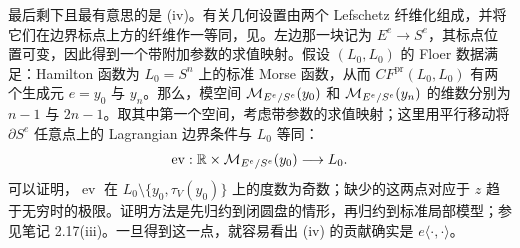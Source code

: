 \begin{note}
最后剩下且最有意思的是 (iv)。有关几何设置由两个 Lefschetz 纤维化组成，并将它们在边界标点上方的纤维作一等同，见。左边那一块记为 $E^e\to S^e$，其标点位置可变，因此得到一个带附加参数的求值映射。假设 $(L_0,L_0)$ 的 Floer 数据满足：Hamilton 函数为 $L_0=S^n$ 上的标准 Morse 函数，从而 $CF^{\mathrm{pr}}(L_0,L_0)$ 有两个生成元 $e=y_0$ 与 $y_n$。那么，模空间 $\mathcal M_{E^e/S^e}(y_0)$ 和 $\mathcal M_{E^e/S^e}(y_n)$ 的维数分别为 $n-1$ 与 $2n-1$。取其中第一个空间，考虑带参数的求值映射；这里用平行移动将 $\partial S^e$ 任意点上的 Lagrangian 边界条件与 $L_0$ 等同：
\[
\operatorname{ev}:\mathbb R\times\mathcal M_{E^e/S^e}(y_0)\longrightarrow L_0.
\]
可以证明，$\operatorname{ev}$ 在 $L_0\setminus\{y_0,\tau_V(y_0)\}$ 上的度数为奇数；缺少的这两点对应于 $z$ 趋于无穷时的极限。证明方法是先归约到闭圆盘的情形，再归约到标准局部模型；参见笔记 2.17(iii)。一旦得到这一点，就容易看出 (iv) 的贡献确实是 $e\langle\cdot,\cdot\rangle$。
\end{note}
